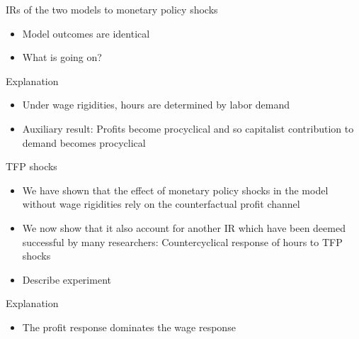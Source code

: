 \documentclass{beamer}
\newcommand{\bit}{\begin{itemize}}
\newcommand{\eit}{\end{itemize}}
\begin{document}
\begin{frame}{IRs of the two models to monetary policy shocks}

\bit
	\item Model outcomes are identical 
	\item What is going on? 
\eit


\end{frame}


\begin{frame}{Explanation}

\bit
	\item Under wage rigidities, hours are determined by labor demand 
	\item Auxiliary result: Profits become procyclical and so capitalist contribution to demand becomes procyclical
\eit


\end{frame}

\begin{frame}{TFP shocks}

\bit
	\item We have shown that the effect of monetary policy shocks in the model without wage rigidities rely on the counterfactual profit channel
	\item We now show that it also account for another IR which have been deemed successful by many researchers: Countercyclical response of hours to TFP shocks
	\item Describe experiment
\eit


\end{frame}

\begin{frame}{Explanation}

\bit
	\item The profit response dominates the wage response
\eit


\end{frame}
\end{document}
